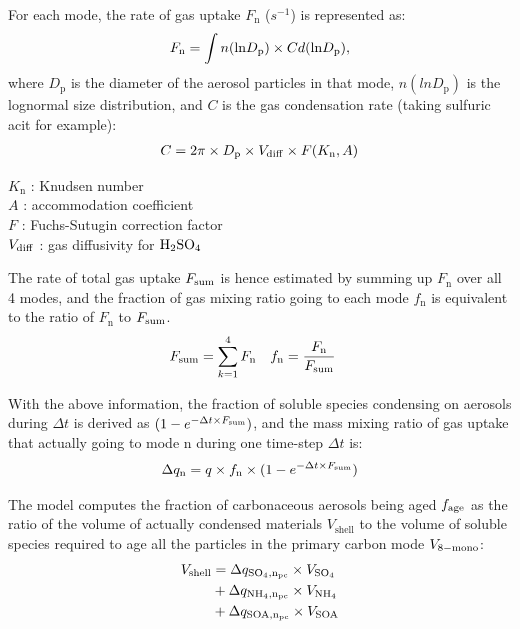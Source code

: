 \documentclass[12pt]{article}
\begin{document}
		 For each mode, the rate of gas uptake $F_\text{n}$ ($s^{-1}$) is represented as:
		 \begin{equation}
		 F_\text{n} = \int n(\text{ln}D_{\rm{p}})\times C d(\text{ln}D_\text{p}) ,
		 \end{equation}
		 where $D_\text{p}$ is the diameter of the aerosol particles in that mode, $n(lnD_\text{p})$ is the lognormal size distribution, and $C$ is the gas condensation rate (taking sulfuric acit for example):
		 \begin{align}
		 C = 2\pi \times D_\text{p} \times V_{\rm{diff}} \times F(K_\text{n}, A)  
		 \end{align}
		 
		 \begin{flushleft}
		 	$K_\text{n}$ : Knudsen number \\
		 	$A$ : accommodation coefficient \\
		 	$F$ : Fuchs-Sutugin correction factor \\
		 	$V_{\rm{diff}}$ : gas diffusivity for  $\rm{H_2SO_4}$
		 \end{flushleft}
		 The rate of total gas uptake $F_{\rm{sum}}$ is hence estimated by summing up $F_\text{n}$ over all 4 modes, and the fraction of gas mixing ratio going to each mode $f_\text{n}$ is equivalent to the ratio of $F_\text{n}$ to $F_{\rm{sum}}$.
		 \begin{align}
		 F_{\rm{sum}}  &= \sum_{k=1}^4 F_\text{n}          &
		 f_\text{n}          &= \frac{F_\text{n}}{F_{\rm{sum}}} 
		 \end{align}
		 
		 With the above information, the fraction of soluble species condensing on aerosols during $\Delta t$ is derived as $(1 - e^{-\Delta t\times F_{\rm{sum}}})$, and the mass mixing ratio of gas uptake that actually going to mode n during one time-step $\Delta t$ is:
		 \begin{equation}
		 \Delta q_\text{n} = q \times f_\text{n} \times (1 - e^{-\Delta t\times F_ {\rm{sum}}})
		 \end{equation}
	
		 The model computes the fraction of carbonaceous aerosols being aged $f_{\rm{age}}$ as the ratio of the volume of actually condensed materials $V_\text{shell}$ to the volume of soluble species required to age all the particles in the primary carbon mode $V_{\rm{8-mono}}$:
		 \begin{align}
		 \begin{split}
		 V_{\rm{shell}} &=  \Delta q_{\rm{SO_4}, n_{\rm{pc}}} \times V_{\rm{SO_4}} \\
		 &+ \Delta q_{\rm{NH_4}, n_{\rm{pc}}} \times V_{\rm{NH_4}} \\
		 &+ \Delta q_{\rm{SOA}, n_{\rm{pc}}} \times V_{\rm{SOA}} 
		 \end{split}
		 \end{align}
		 
\end{document}
